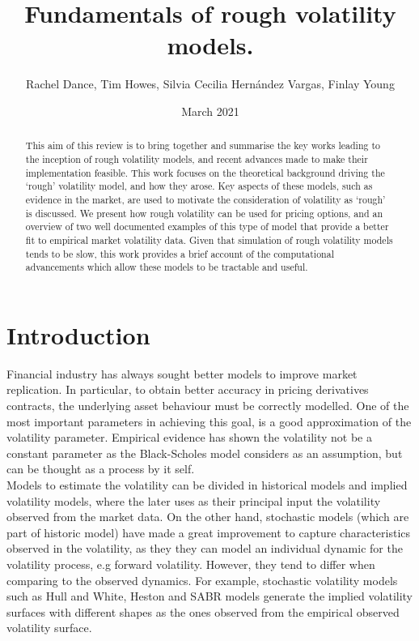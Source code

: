 \documentclass[12pt,oneside]{article}
\title{Fundamentals of rough volatility models.}
\date{ March 2021 }
\author{Rachel Dance, Tim Howes, Silvia Cecilia Hernández Vargas, Finlay Young}
\begin{document}
  \maketitle

  \begin{abstract}This aim of this review is to bring together and summarise the key works leading to the inception of rough volatility models, and recent advances made to make their implementation feasible. This work focuses on the theoretical background driving the `rough' volatility model, and how they arose. Key aspects of these models, such as evidence in the market, are used to motivate the consideration of volatility as `rough' is discussed. We present how rough volatility can be used for pricing options, and an overview of two well documented examples of this type of model that provide a better fit to empirical market volatility data. Given that simulation of rough volatility models tends to be slow, this work provides a brief account of the computational advancements which allow these models to be tractable and useful.
  \end{abstract}

  \tableofcontents
 \newpage

\section{Introduction}
Financial industry has always sought better models to improve market replication. In particular, to obtain better accuracy in pricing derivatives contracts, the underlying asset behaviour must be correctly modelled. One of the most important parameters in achieving this goal, is a good approximation of the volatility parameter. Empirical evidence has shown the volatility not be a constant parameter as the Black-Scholes model considers as an assumption, but can be thought as a process by it self.
\\

Models to estimate the volatility can be divided in historical models and implied volatility models, where the later uses as their principal input the volatility observed from the market data. On the other hand, stochastic models (which are part of historic model) have made a great improvement to capture characteristics observed in the volatility, as they they can model an individual dynamic for the volatility process, e.g forward volatility. However, they tend to differ when comparing to the observed dynamics. For example, stochastic volatility models such as Hull and White, Heston and SABR models generate the implied volatility surfaces with different shapes as the ones observed from the empirical observed volatility surface.
\\
\end{document}
